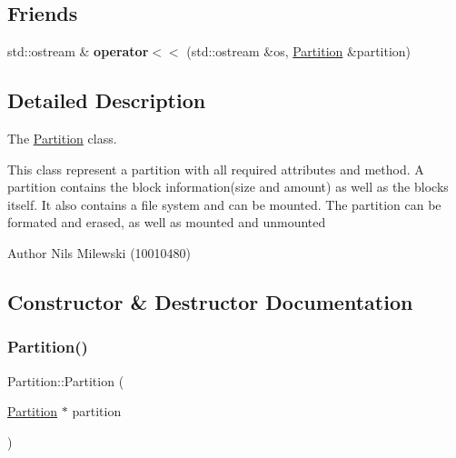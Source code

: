 \subsection*{Friends}
\begin{DoxyCompactItemize}
\item 
\mbox{\label{classlogic_1_1_partition_a9182c56fedac445f5d17d76f2efc9896}} 
std\+::ostream \& {\bfseries operator$<$$<$} (std\+::ostream \&os, \mbox{\hyperlink{classlogic_1_1_partition}{Partition}} \&partition)
\end{DoxyCompactItemize}


\subsection{Detailed Description}
The \mbox{\hyperlink{classlogic_1_1_partition}{Partition}} class. 

This class represent a partition with all required attributes and method. A partition contains the block information(size and amount) as well as the blocks itself. It also contains a file system and can be mounted. The partition can be formated and erased, as well as mounted and unmounted \begin{DoxyAuthor}{Author}
Nils Milewski (10010480) 
\end{DoxyAuthor}


\subsection{Constructor \& Destructor Documentation}
\mbox{\label{classlogic_1_1_partition_acb291b3b0ccf48005e141be32fdd7efd}} 
\subsubsection{\texorpdfstring{Partition()}{Partition()}\hspace{0.1cm}{\footnotesize\ttfamily [1/3]}}
{\footnotesize\ttfamily Partition\+::\+Partition (\begin{DoxyParamCaption}\item[{\mbox{\hyperlink{classlogic_1_1_partition}{Partition}} $\ast$}]{partition }\end{DoxyParamCaption})\hspace{0.3cm}{\ttfamily [private]}}



